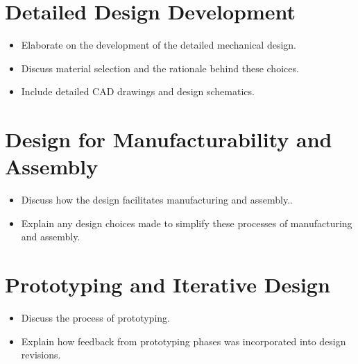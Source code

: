 
\section{Detailed Design Development}
\begin{itemize}
	\item Elaborate on the development of the detailed mechanical design.
	\item Discuss material selection and the rationale behind these choices.
	\item Include detailed CAD drawings and design schematics.
\end{itemize}
\section{Design for Manufacturability and Assembly}
\begin{itemize}
	\item Discuss how the design facilitates manufacturing and assembly..
	\item Explain any design choices made to simplify these processes of manufacturing and assembly.
\end{itemize}
\section{Prototyping and Iterative Design}
\begin{itemize}
	\item Discuss the process of prototyping.
	\item Explain how feedback from prototyping phases was incorporated into design revisions.
\end{itemize}

